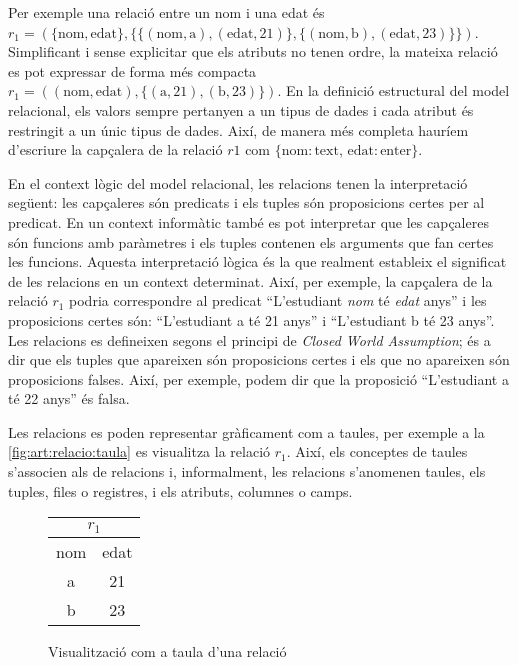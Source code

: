 Per exemple una relació entre un nom i una edat és
$r_1=(\{\text{nom},\text{edat} \}, \{
\{(\text{nom},\text{a}),(\text{edat},21)\},
\{(\text{nom},\text{b}),(\text{edat},23) \} \})$.  Simplificant i
sense explicitar que els atributs no tenen ordre, la mateixa relació
es pot expressar de forma més compacta $r_1=(
(\text{nom},\text{edat}), \{ (\text{a},21),(\text{b},23) \})$.  En la
definició estructural del model relacional, els valors sempre
pertanyen a un tipus de dades i cada atribut és restringit a un únic
tipus de dades. Així, de manera més completa hauríem d'escriure la
capçalera de la relació $r1$ com $\{\text{nom}: \text{text},\,
\text{edat}:\text{enter} \}$.


En el context lògic del model relacional, les relacions tenen la
interpretació següent: les capçaleres són predicats i els tuples són
proposicions certes per al predicat. En un context informàtic també es
pot interpretar que les capçaleres són funcions amb paràmetres i els
tuples contenen els arguments que fan certes les funcions.  Aquesta
interpretació lògica és la que realment estableix el significat de les
relacions en un context determinat.  Així, per exemple, la capçalera
de la relació $r_1$ podria correspondre al predicat ``L'estudiant
\emph{nom} té \emph{edat} anys'' i les proposicions certes són:
``L'estudiant a té 21 anys'' i ``L'estudiant b té 23 anys''.  Les
relacions es defineixen segons el principi de \emph{Closed World
  Assumption}; és a dir que els tuples que apareixen són proposicions
certes i els que no apareixen són proposicions falses. Així, per
exemple, podem dir que la proposició ``L'estudiant a té 22 anys'' és
falsa.



Les relacions es poden representar gràficament com a taules, per
exemple a la \autoref{fig:art:relacio:taula} es visualitza la relació
$r_1$.  Així, els conceptes de taules s'associen als de relacions i,
informalment, les relacions s'anomenen taules, els tuples, files o
registres, i els atributs, columnes o camps.

\begin{figure}[tp]
  \centering
  \begin{tabular}[c]{|c|c|}
    \multicolumn{2}{c}{$r_1$} \\ \hline
    nom  & edat \\ \hline
    a  & 21 \\
    b  & 23 \\ \hline
  \end{tabular} 
  \caption{Visualització com a taula d'una relació}
  \label{fig:art:relacio:taula}
\end{figure}

